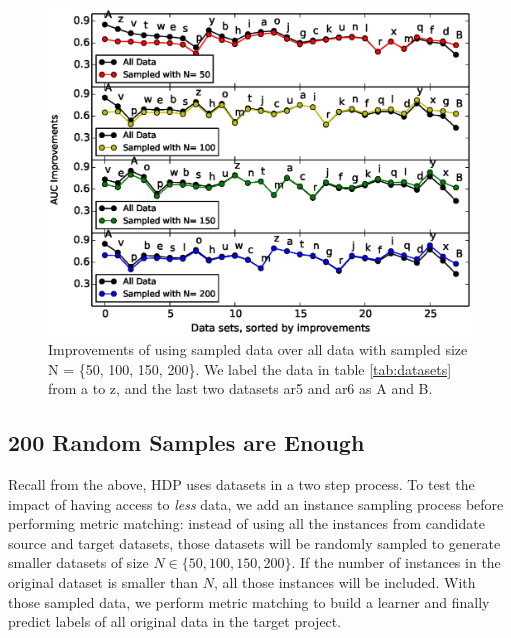 \begin{figure}[t]
	\centering
	\includegraphics[width=\linewidth]{Figures/raleigh/sample_random.eps}
	\caption{Improvements of using sampled data over all data with sampled size N = \{50, 100, 150, 200\}. We label the data in table \ref{tab:datasets} from a to z, and the last two datasets ar5 and ar6 as A and B.}
	\label{fig:small_data}
\end{figure}


\subsection{200 Random Samples are Enough}

Recall from the above,
HDP uses  datasets  in a two step process.
To test the impact of having access to {\em less} data,
we  add an instance sampling process before performing metric matching:
instead of using all the instances from
candidate source and target datasets, those datasets will
be randomly sampled to generate smaller datasets of
size $N \in \{50, 100, 150, 200\}$. If
the number of instances in the original dataset is
smaller than $N$, all those instances will be
included. With those sampled data, we perform metric matching to build a learner
and finally predict labels of all original data in the target project.

